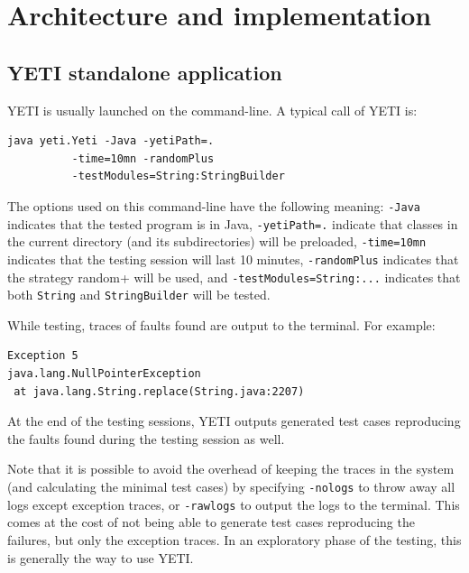 
\section{Architecture and implementation}\label{sec:architecture}

\subsection{YETI standalone application}
YETI is usually launched on the command-line. A typical call of YETI is:
{\small
\begin{verbatim}
java yeti.Yeti -Java -yetiPath=. 
          -time=10mn -randomPlus
          -testModules=String:StringBuilder 
\end{verbatim}
}

The options used on this command-line have the following meaning: \texttt{-Java} 
indicates that the tested program is in Java, \texttt{-yetiPath=.} indicate that 
classes in the current directory (and its subdirectories) will be preloaded, 
\texttt{-time=10mn} indicates that the testing session will last 10 minutes, 
\texttt{-randomPlus} indicates that the strategy random+ will be used, and 
\texttt{-testModules=String:...} indicates that 
both \texttt{String} and \texttt{StringBuilder} will be tested.

While testing, traces of faults found are output to the terminal. For example:

{\small
\begin{verbatim}
Exception 5
java.lang.NullPointerException
 at java.lang.String.replace(String.java:2207)
\end{verbatim}
}

At the end of the testing sessions, YETI outputs generated test cases reproducing 
the faults found during the testing session as well.

Note that it is possible to avoid the overhead of keeping the 
traces in the system (and calculating the minimal test cases) by specifying 
\texttt{-nologs} to throw away all logs except exception traces, or 
\texttt{-rawlogs} to output the logs to the terminal. This comes at the cost of
not being able to generate test cases reproducing the failures, but only the 
exception traces. In an exploratory phase of the testing, this is generally the
way to use YETI.



